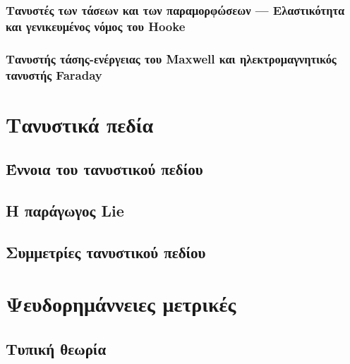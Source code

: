 \documentclass[11pt,a4paper,twoside,openright]{book}
\begin{document}
\subsection{Τανυστές των τάσεων και των παραμορφώσεων --- Ελαστικότητα και γενικευμένος νόμος του Hooke}
\subsection{Τανυστής τάσης-ενέργειας του Maxwell και ηλεκτρομαγνητικός τανυστής Faraday}

\chapter{Τανυστικά πεδία}
	\label{chapter:tensor-fields}
	
\section{Έννοια του τανυστικού πεδίου}

\section{Η παράγωγος Lie}
	\label{sec:lie-derivative}
	
\section{Συμμετρίες τανυστικού πεδίου}


\chapter{Ψευδορημάννειες μετρικές}
	\label{chapter:pseudoriemannian-metrics}
	
\section{Τυπική θεωρία}
	
\end{document}
